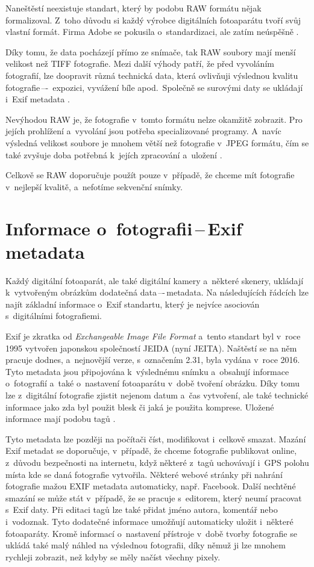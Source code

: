 Naneštěstí neexistuje standart, který by podobu RAW formátu nějak formalizoval. Z~toho důvodu si každý výrobce digitálních fotoaparátu tvoří svůj vlastní formát. Firma Adobe se pokusila o~standardizaci, ale zatím neúspěšně \cite{RAW1}. 

Díky tomu, že data pocházejí přímo ze snímače, tak RAW soubory mají menší velikost než TIFF fotografie. Mezi další výhody patří, že před vyvoláním fotografií, lze doopravit různá technická data, která ovlivňuji výslednou kvalitu fotografie\,–-\, expozici, vyvážení bíle apod.~Společně se surovými daty se ukládají i~Exif metadata \cite{RAW_celkove}.

Nevýhodou RAW je, že fotografie v~tomto formátu nelze okamžitě zobrazit. Pro jejích prohlížení a~vyvolání jsou potřeba specializované programy. A~navíc výsledná velikost soubore je mnohem větší než fotografie v~JPEG formátu, čím se také zvyšuje doba potřebná k~jejích zpracování a~uložení \cite{RAW2}.

Celkově se RAW doporučuje použít pouze v~případě, že chceme mít fotografie v~nejlepší kvalitě, a~nefotíme sekvenční snímky.

\section{Informace o~fotografii\,--\,Exif metadata}
\label{Exif_metadata}
Každý digitální fotoaparát, ale také digitální kamery a~některé skenery, ukládají k~vytvořeným obrázkům dodatečná data\,–-\,metadata. Na následujících řádcích lze najít základní informace o~Exif standartu, který je nejvíce asociován s~digitálními fotografiemi.

Exif je zkratka od \textit{Exchangeable Image File Format} a~tento standart byl v~roce 1995 vytvořen japonskou společností JEIDA (nyní JEITA). Naštěstí se na něm pracuje dodnes, a~nejnovější verze, s~označením 2.31, byla vydána v~roce 2016. Tyto metadata jsou připojována k~výslednému snímku a~obsahují informace o~fotografií a~také o~nastavení fotoaparátu v~době tvoření obrázku. Díky tomu lze z~digitální fotografie zjistit nejenom datum a~čas vytvoření, ale také technické informace jako zda byl použit blesk či jaká je použita komprese. Uložené informace mají podobu tagů \cite{EXIV_standart}.

Tyto metadata lze později na počítači číst, modifikovat i~celkově smazat. Mazání Exif metadat se doporučuje, v~případě, že chceme fotografie publikovat online, z~důvodu bezpečnosti na internetu, když některé z~tagů uchovávají i~GPS polohu místa kde se daná fotografie vytvořila\cite{EXIV_remove}. Některé webové stránky při nahrání fotografie mažou EXIF metadata automaticky, např. Facebook. Další nechtěné smazání se může stát v~případě, že se pracuje s~editorem, který neumí pracovat s~Exif daty. Při editaci tagů lze také přidat jméno autora, komentář nebo i~vodoznak. Tyto dodatečné informace umožňují automaticky uložit i~některé fotoaparáty. Kromě informací o~nastavení přístroje v~době tvorby fotografie se ukládá také malý náhled na výslednou fotografii, díky němuž ji lze mnohem rychleji zobrazit, než kdyby se měly načíst všechny pixely.


